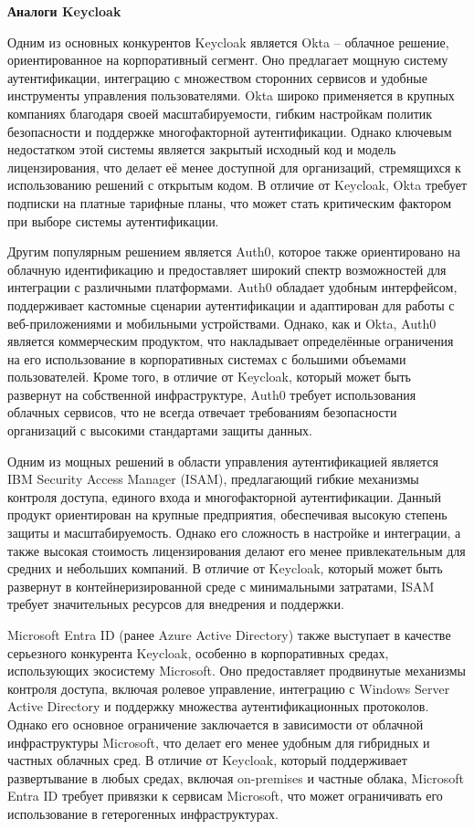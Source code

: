 \textbf{Аналоги Keycloak}

Одним из основных конкурентов Keycloak является Okta – облачное решение, ориентированное на корпоративный сегмент. Оно предлагает мощную систему аутентификации, интеграцию с множеством сторонних сервисов и удобные инструменты управления пользователями. Okta широко применяется в крупных компаниях благодаря своей масштабируемости, гибким настройкам политик безопасности и поддержке многофакторной аутентификации. Однако ключевым недостатком этой системы является закрытый исходный код и модель лицензирования, что делает её менее доступной для организаций, стремящихся к использованию решений с открытым кодом. В отличие от Keycloak, Okta требует подписки на платные тарифные планы, что может стать критическим фактором при выборе системы аутентификации.

Другим популярным решением является Auth0, которое также ориентировано на облачную идентификацию и предоставляет широкий спектр возможностей для интеграции с различными платформами. Auth0 обладает удобным интерфейсом, поддерживает кастомные сценарии аутентификации и адаптирован для работы с веб-приложениями и мобильными устройствами. Однако, как и Okta, Auth0 является коммерческим продуктом, что накладывает определённые ограничения на его использование в корпоративных системах с большими объемами пользователей. Кроме того, в отличие от Keycloak, который может быть развернут на собственной инфраструктуре, Auth0 требует использования облачных сервисов, что не всегда отвечает требованиям безопасности организаций с высокими стандартами защиты данных.

Одним из мощных решений в области управления аутентификацией является IBM Security Access Manager (ISAM), предлагающий гибкие механизмы контроля доступа, единого входа и многофакторной аутентификации. Данный продукт ориентирован на крупные предприятия, обеспечивая высокую степень защиты и масштабируемость. Однако его сложность в настройке и интеграции, а также высокая стоимость лицензирования делают его менее привлекательным для средних и небольших компаний. В отличие от Keycloak, который может быть развернут в контейнеризированной среде с минимальными затратами, ISAM требует значительных ресурсов для внедрения и поддержки.

Microsoft Entra ID (ранее Azure Active Directory) также выступает в качестве серьезного конкурента Keycloak, особенно в корпоративных средах, использующих экосистему Microsoft. Оно предоставляет продвинутые механизмы контроля доступа, включая ролевое управление, интеграцию с Windows Server Active Directory и поддержку множества аутентификационных протоколов. Однако его основное ограничение заключается в зависимости от облачной инфраструктуры Microsoft, что делает его менее удобным для гибридных и частных облачных сред. В отличие от Keycloak, который поддерживает развертывание в любых средах, включая on-premises и частные облака, Microsoft Entra ID требует привязки к сервисам Microsoft, что может ограничивать его использование в гетерогенных инфраструктурах.

